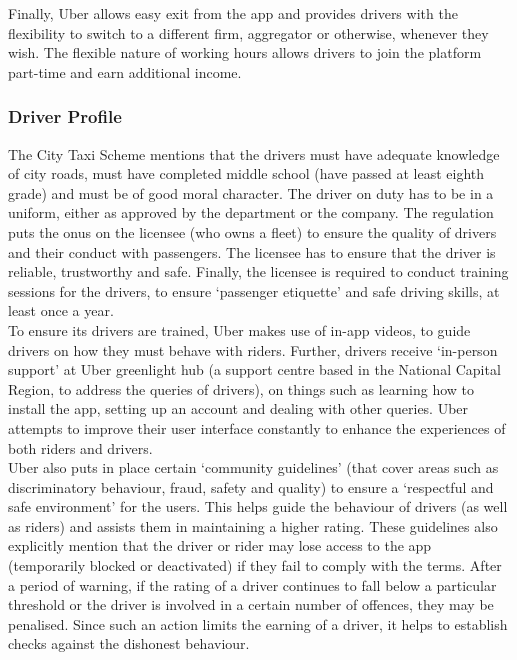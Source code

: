 \documentclass[a4paper, 12pt]{article}
\begin{document}
Finally, Uber allows easy exit from the app and provides drivers with the flexibility to switch to a different firm, aggregator or otherwise, whenever they wish. The flexible nature of working hours allows drivers to join the platform part-time and earn additional income.

\subsubsection{Driver Profile}
The City Taxi Scheme mentions that the drivers must have adequate knowledge of city roads, must have completed middle school (have passed at least eighth grade) and must be of good moral character. The driver on duty has to be in a uniform, either as approved by the department or the company. The regulation puts the onus on the licensee (who owns a fleet) to ensure the quality of drivers and their conduct with passengers. The licensee has to ensure that the driver is reliable, trustworthy and safe. Finally, the licensee is required to conduct training sessions for the drivers, to ensure ‘passenger etiquette’ and safe driving skills, at least once a year. \\

To ensure its drivers are trained, Uber makes use of in-app videos, to guide drivers on how they must behave with riders. Further, drivers receive ‘in-person support’ at Uber greenlight hub (a support centre based in the National Capital Region, to address the queries of drivers), on things such as learning how to install the app, setting up an account and dealing with other queries. Uber attempts to improve their user interface constantly to enhance the experiences of both riders and drivers. \\

Uber also puts in place certain ‘community guidelines’ (that cover areas such as discriminatory behaviour, fraud, safety and quality) to ensure a ‘respectful and safe environment’ for the users. This helps guide the behaviour of drivers (as well as riders) and assists them in maintaining a higher rating. These guidelines also explicitly mention that the driver or rider may lose access to the app (temporarily blocked or deactivated) if they fail to comply with the terms. After a period of warning, if the rating of a driver continues to fall below a particular threshold or the driver is involved in a certain number of offences, they may be penalised. Since such an action limits the earning of a driver, it helps to establish checks against the dishonest behaviour. 
\end{document}
